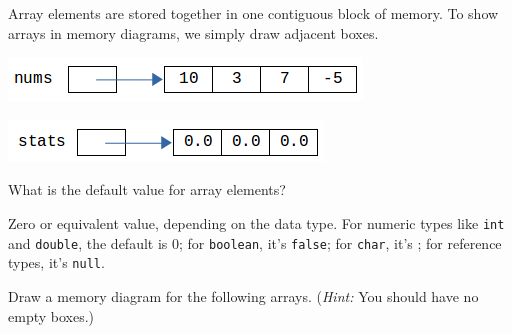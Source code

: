 
Array elements are stored together in one contiguous block of memory.
To show arrays in memory diagrams, we simply draw adjacent boxes.

\begin{multicols}{2}

\begin{center}

\vspace{1ex}
\includegraphics[scale=0.65]{array-diagram1.png}
\end{center}

\columnbreak

\begin{center}

\vspace{1ex}
\includegraphics[scale=0.65]{array-diagram2.png}
\end{center}

\end{multicols}




\Q What is the default value for array elements?

\begin{answer}[3em]
Zero or equivalent value, depending on the data type.
For numeric types like {\tt int} and {\tt double}, the default is 0; for {\tt boolean}, it's {\tt false}; for {\tt char}, it's {\tt {}\qs}; for reference types, it's {\tt null}.
\end{answer}


\Q Draw a memory diagram for the following arrays.
(\textit{Hint:} You should have no empty boxes.)

